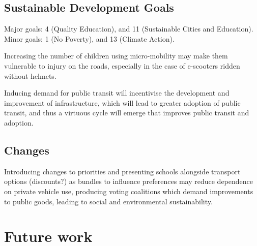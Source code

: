 \documentclass{article}
\begin{document}
\begin{multicols}{2}
\subsection{Sustainable Development Goals}
Major goals: 4 (Quality Education), and 11 (Sustainable Cities and Education).
Minor goals: 1 (No Poverty), and 13 (Climate Action).

Increasing the number of children using micro-mobility may make them vulnerable to injury on the roads, especially in the case of e-scooters ridden without helmets.

Inducing demand for public transit will incentivise the development and improvement of infrastructure, which will lead to greater adoption of public transit, and thus a virtuous cycle will emerge that improves public transit and adoption.

\subsection{Changes}
Introducing changes to priorities and presenting schools alongside transport options (discounts?) as bundles to influence preferences may reduce dependence on private vehicle use, producing voting coalitions which demand improvements to public goods, leading to social and environmental sustainability.

\section{Future work}
\end{multicols}

\break
\printbibliography
\end{document}
